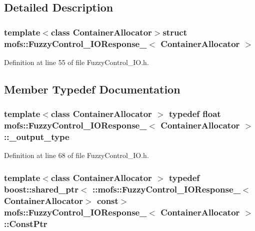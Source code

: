 \subsection{Detailed Description}
\subsubsection*{template$<$class Container\-Allocator$>$struct mofs\-::\-Fuzzy\-Control\-\_\-\-I\-O\-Response\-\_\-$<$ Container\-Allocator $>$}



Definition at line 55 of file Fuzzy\-Control\-\_\-\-I\-O.\-h.



\subsection{Member Typedef Documentation}
\subsubsection[{\-\_\-output\-\_\-type}]{\setlength{\rightskip}{0pt plus 5cm}template$<$class Container\-Allocator $>$ typedef float {\bf mofs\-::\-Fuzzy\-Control\-\_\-\-I\-O\-Response\-\_\-}$<$ Container\-Allocator $>$\-::{\bf \-\_\-output\-\_\-type}}\label{structmofs_1_1FuzzyControl__IOResponse___a96489f175001c823c6cbd85d2219a033}


Definition at line 68 of file Fuzzy\-Control\-\_\-\-I\-O.\-h.

\subsubsection[{Const\-Ptr}]{\setlength{\rightskip}{0pt plus 5cm}template$<$class Container\-Allocator $>$ typedef boost\-::shared\-\_\-ptr$<$ \-::{\bf mofs\-::\-Fuzzy\-Control\-\_\-\-I\-O\-Response\-\_\-}$<$Container\-Allocator$>$ const$>$ {\bf mofs\-::\-Fuzzy\-Control\-\_\-\-I\-O\-Response\-\_\-}$<$ Container\-Allocator $>$\-::{\bf Const\-Ptr}}\label{structmofs_1_1FuzzyControl__IOResponse___a5aa6922243e5b5a2fe921fc69ad483b5}


